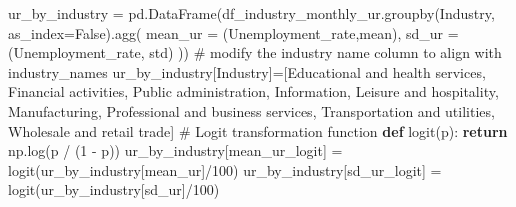 \documentclass[
]{agujournal2019}
\newenvironment{Shaded}{\begin{snugshade}}{\end{snugshade}}
\newcommand{\CommentTok}[1]{\textcolor[rgb]{0.37,0.37,0.37}{#1}}
\newcommand{\ControlFlowTok}[1]{\textcolor[rgb]{0.00,0.23,0.31}{\textbf{#1}}}
\newcommand{\DecValTok}[1]{\textcolor[rgb]{0.68,0.00,0.00}{#1}}
\newcommand{\KeywordTok}[1]{\textcolor[rgb]{0.00,0.23,0.31}{\textbf{#1}}}
\newcommand{\NormalTok}[1]{\textcolor[rgb]{0.00,0.23,0.31}{#1}}
\newcommand{\OperatorTok}[1]{\textcolor[rgb]{0.37,0.37,0.37}{#1}}
\newcommand{\StringTok}[1]{\textcolor[rgb]{0.13,0.47,0.30}{#1}}
\newcommand{\VariableTok}[1]{\textcolor[rgb]{0.07,0.07,0.07}{#1}}
\begin{document}
\begin{Shaded}
\begin{Highlighting}[]
\NormalTok{ur\_by\_industry }\OperatorTok{=}\NormalTok{ pd.DataFrame(df\_industry\_monthly\_ur.groupby(}\StringTok{\textquotesingle{}Industry\textquotesingle{}}\NormalTok{, as\_index}\OperatorTok{=}\VariableTok{False}\NormalTok{).agg(}
\NormalTok{    mean\_ur }\OperatorTok{=}\NormalTok{ (}\StringTok{\textquotesingle{}Unemployment\_rate\textquotesingle{}}\NormalTok{,}\StringTok{\textquotesingle{}mean\textquotesingle{}}\NormalTok{),}
\NormalTok{    sd\_ur }\OperatorTok{=}\NormalTok{ (}\StringTok{\textquotesingle{}Unemployment\_rate\textquotesingle{}}\NormalTok{, }\StringTok{\textquotesingle{}std\textquotesingle{}}\NormalTok{)}
\NormalTok{))}
 \CommentTok{\# modify the industry name column to align with industry\_names}
\NormalTok{ur\_by\_industry[}\StringTok{\textquotesingle{}Industry\textquotesingle{}}\NormalTok{]}\OperatorTok{=}\NormalTok{[}\StringTok{\textquotesingle{}Educational and health services\textquotesingle{}}\NormalTok{,}
                            \StringTok{\textquotesingle{}Financial activities\textquotesingle{}}\NormalTok{,}
                            \StringTok{\textquotesingle{}Public administration\textquotesingle{}}\NormalTok{,}
                            \StringTok{\textquotesingle{}Information\textquotesingle{}}\NormalTok{,}
                            \StringTok{\textquotesingle{}Leisure and hospitality\textquotesingle{}}\NormalTok{,}
                            \StringTok{\textquotesingle{}Manufacturing\textquotesingle{}}\NormalTok{,}
                            \StringTok{\textquotesingle{}Professional and business services\textquotesingle{}}\NormalTok{,}
                            \StringTok{\textquotesingle{}Transportation and utilities\textquotesingle{}}\NormalTok{,}
                            \StringTok{\textquotesingle{}Wholesale and retail trade\textquotesingle{}}\NormalTok{]}
\CommentTok{\# Logit transformation function}
\KeywordTok{def}\NormalTok{ logit(p):}
    \ControlFlowTok{return}\NormalTok{ np.log(p }\OperatorTok{/}\NormalTok{ (}\DecValTok{1} \OperatorTok{{-}}\NormalTok{ p))}
\NormalTok{ur\_by\_industry[}\StringTok{\textquotesingle{}mean\_ur\_logit\textquotesingle{}}\NormalTok{] }\OperatorTok{=}\NormalTok{ logit(ur\_by\_industry[}\StringTok{\textquotesingle{}mean\_ur\textquotesingle{}}\NormalTok{]}\OperatorTok{/}\DecValTok{100}\NormalTok{)}
\NormalTok{ur\_by\_industry[}\StringTok{\textquotesingle{}sd\_ur\_logit\textquotesingle{}}\NormalTok{] }\OperatorTok{=}\NormalTok{ logit(ur\_by\_industry[}\StringTok{\textquotesingle{}sd\_ur\textquotesingle{}}\NormalTok{]}\OperatorTok{/}\DecValTok{100}\NormalTok{)}


\end{Highlighting}
\end{Shaded}
\end{document}
